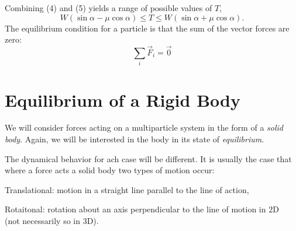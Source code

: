 \documentclass[12pt]{article}
\begin{document}
Combining (4) and (5) yields a range of possible values of $T$,
\[
W(\sin\alpha  - \mu\cos\alpha ) \le T \le W(\sin\alpha  + \mu\cos\alpha ).
\]
The equilibrium condition for a particle is that
the sum of the vector forces are zero:
\[
    \sum_{i}^{} \vec{F}_{i} = \vec{0}
\]


\section{Equilibrium of a Rigid Body}
\setcounter{equation}{0}

We will consider forces acting on a multiparticle system
in the form of a \emph{solid body}. Again, we will be
interested in the body in its state of \emph{equilibrium}.

The dynamical behavior for ach case will be different.
It is usually the case that where a force
acts a solid body two types of motion occur:

\begin{compactitem}
    \item Translational: motion in a straight line parallel to the line of action,
    \item Rotaitonal: rotation about an axis perpendicular to the line of motion in 2D\\
        (not necessarily so in 3D).
\end{compactitem}
\end{document}
